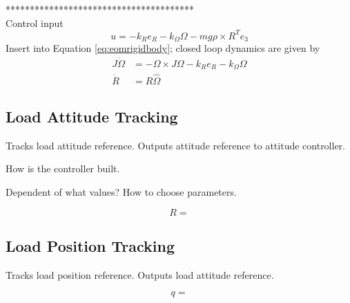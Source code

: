 ***************************************\\

Control input \cite{Lee2011}
\begin{equation}\label{eq:inputattitude}
u=-k_Re_R-k_\Omega\Omega-mg\rho\times R^Te_3
\end{equation}
Insert into Equation \ref{eq:eomrigidbody}; closed loop dynamics are given by
\begin{align}\label{eq:CLdynamics}
J\dot{\Omega} &= -\Omega\times J\Omega-k_Re_R-k_\Omega\Omega \\
\dot{R} &= R\hat{\Omega}
\end{align}

\subsection{Load Attitude Tracking}

Tracks load attitude reference. Outputs attitude reference to attitude controller.
	
How is the controller built.

Dependent of what values? 	How to choose parameters.

\begin{figure}[h!]
	\centering
	\caption{\label{fig:con.loadattloop}}
\end{figure}		

\begin{equation}\label{key}
R = 
\end{equation}

\subsection{Load Position Tracking}

Tracks load position reference. Outputs load attitude reference.

\begin{equation}\label{key}
q =
\end{equation}

\begin{figure}[h!]
	\centering
	\caption{\label{fig:con.loadposloop}}
\end{figure}		

